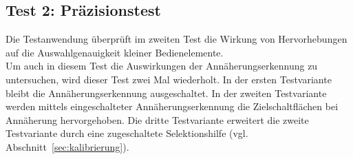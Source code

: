 \documentclass[12pt,numbers=noenddot,parskip,bibliography=totocnumbered,listof=totocnumbered]{scrreprt}
\begin{document}
\subsection{Test 2: Präzisionstest}

Die Testanwendung überprüft im zweiten Test die Wirkung von Hervorhebungen auf die Auswahlgenauigkeit kleiner Bedienelemente.\\
Um auch in diesem Test die Auswirkungen der Annäherungserkennung zu untersuchen, wird dieser Test zwei Mal wiederholt. In der ersten Testvariante bleibt die Annäherungserkennung ausgeschaltet. In der zweiten Testvariante werden mittels eingeschalteter Annäherungserkennung die Zielschaltflächen bei Annäherung hervorgehoben. Die dritte Testvariante erweitert die zweite Testvariante durch eine zugeschaltete Selektionshilfe (vgl. Abschnitt~\ref{sec:kalibrierung}).
\end{document}

